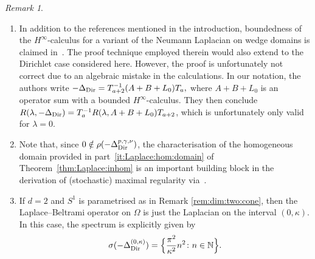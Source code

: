 \documentclass[12pt,a4paper, reqno]{amsart}
\theoremstyle{plain}
\theoremstyle{definition}
\theoremstyle{remark}
\newtheorem{remark}[theorem]{Remark}
\numberwithin{equation}{section}
\newcommand{\1}{\mathbbm{1}}
\newcommand{\N}{\ensuremath{\mathbb{N}}}
\newcommand{\Dir}{\textup{Dir}}
\begin{document}
\begin{remark}
\begin{enumerate}[\textup{(\roman*)}]
In addition, Theorem~\ref{thm:Laplace:inhom} allows for several extensions of the results mentioned above. In particular, as already mentioned in the introduction, other than in~\cite{KimLeeSeo2021,KimLeeSeo2022b}, we are able to allow for differing  integrability parameters with respect to time and space, which, at least at this stage, is not possible within the other approaches used so far.
Moreover, since the admissible range in Theorem~\ref{thm:Laplace:inhom} is considerably larger than~\eqref{eq:range:gamma-nu:KimLeeSeo}, we have more freedom with the parameters, which is particularly important when moving towards nonlinear (S)PDEs~\cite{AgrestiVeraar2022a,AgrestiVeraar2022b, AgrVer2025}.
Finally, it is worth noting that our result can also be used to obtain maximal regularity results for (stochastic) Volterra equations on angular domains by means of~\cite{DesLon2013}. To the best of our knowledge, these would be the first results for such stochastic evolution equations on conical domains.

\item\label{it:rem:main:MaierSaal} 
In addition to the references mentioned in the introduction, boundedness of the $H^\infty$-calculus for a variant of the Neumann Laplacian on wedge domains is claimed in~\cite[Proposition~4]{MaierSaal2014}. The proof technique employed therein would also extend to the Dirichlet case considered here.
However, the proof is unfortunately not correct due to an algebraic mistake in the calculations.
In our notation, the authors write $-\Delta_\Dir = T_{a+2}^{-1} (A+B+L_0) T_a,$ where $A+B+L_0$ is an operator sum with a bounded $H^\infty$-calculus. They then conclude 
$R(\lambda, -\Delta_\Dir)= T_a^{-1} R(\lambda,A+B+L_0)T_{a+2}$, which is unfortunately only valid for $\lambda=0$.


\item Note that, since $0\notin\rho(-\Delta_\Dir^{p,\gamma,\nu})$, the characterisation of the homogeneous domain provided in part~\ref{it:Laplace:hom:domain} of Theorem~\ref{thm:Laplace:inhom} is an important building block in the derivation of (stochastic) maximal regularity via~\cite{NeeVerWei2012}.
\item\label{it:rem:main:dim:2} 
If $d=2$ and $S^1$ is parametrised as in Remark \ref{rem:dim:two:cone}, then the Laplace--Beltrami operator on $\Omega$ is just the Laplacian on the interval $(0,\kappa)$.
In this case, the spectrum is explicitly given by 
\[\sigma(-\Delta_\Dir^{(0,\kappa)})=\Big\{\frac{\pi^2}{\kappa^2}n^2\colon n\in \N\Big\}.\]
\end{enumerate}
\end{remark}
\end{document}
